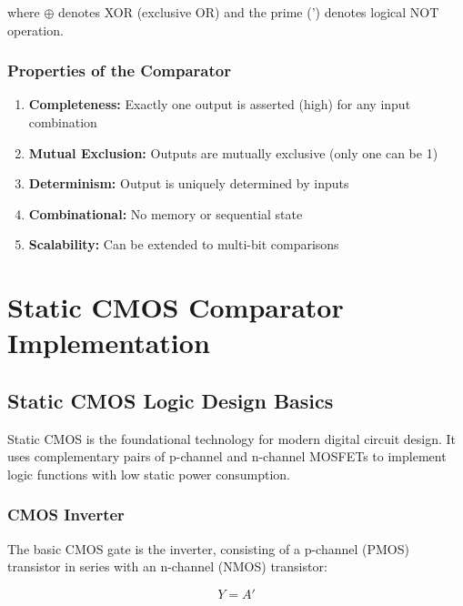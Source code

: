 \documentclass[12pt,a4paper,twoside]{report}
\begin{document}
where $\oplus$ denotes XOR (exclusive OR) and the prime (') denotes logical NOT operation.

\subsection{Properties of the Comparator}

\begin{enumerate}
    \item \textbf{Completeness:} Exactly one output is asserted (high) for any input combination
    \item \textbf{Mutual Exclusion:} Outputs are mutually exclusive (only one can be 1)
    \item \textbf{Determinism:} Output is uniquely determined by inputs
    \item \textbf{Combinational:} No memory or sequential state
    \item \textbf{Scalability:} Can be extended to multi-bit comparisons
\end{enumerate}

\chapter{Static CMOS Comparator Implementation}
\label{ch:static_cmos}

\section{Static CMOS Logic Design Basics}

Static CMOS is the foundational technology for modern digital circuit design. It uses complementary pairs of p-channel and n-channel MOSFETs to implement logic functions with low static power consumption.

\subsection{CMOS Inverter}

The basic CMOS gate is the inverter, consisting of a p-channel (PMOS) transistor in series with an n-channel (NMOS) transistor:

\begin{equation}
Y = A'
\end{equation}
\end{document}
